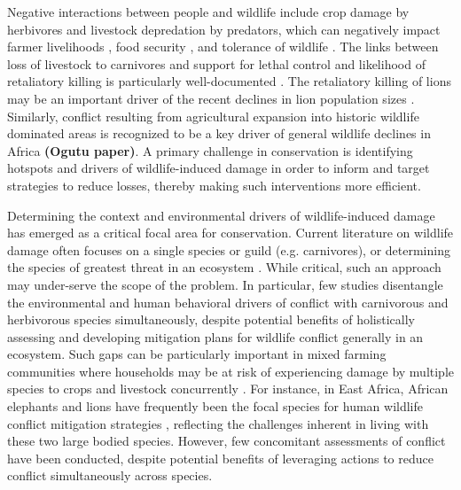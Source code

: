 \documentclass[12pt,]{article}
\begin{document}
Negative interactions between people and wildlife include crop damage by herbivores and livestock depredation by predators, which can negatively impact farmer livelihoods \citep{Hill2000, Kaswamila2007}, food security \citep{Hill2000, Kaswamila2007, Mackenzie2012}, and tolerance of wildlife \citep{Boer1998, Gadd2005ConservationKenya, Ogada2003, Bencin2016, Woodroffe2005, Kaltenborn2006, NaughtonTreves1997}. %
The links between loss of livestock to carnivores and support for lethal control and likelihood of retaliatory killing is particularly well-documented \citep{Ogada2003, Kissui2008}. The retaliatory killing of lions may be an important driver of the recent declines in lion population sizes \citep{Riggio2013, Ripple2014}. Similarly, conflict resulting from agricultural expansion into historic wildlife dominated areas is recognized to be a key driver of general wildlife declines in Africa \textbf{(Ogutu paper)}.  A primary challenge in conservation is identifying hotspots and drivers of wildlife-induced damage in order to inform and target strategies to reduce losses, thereby making such interventions more efficient. 

Determining the context and environmental drivers of wildlife-induced damage has emerged as a critical focal area for conservation. Current literature on wildlife damage often focuses on a single species or guild (e.g. carnivores), or determining the species of greatest threat in an ecosystem \citep{Dickman2013}. While critical, such an approach may under-serve the scope of the problem. In particular, few studies disentangle the environmental and human behavioral drivers of conflict with carnivorous and herbivorous species simultaneously, despite potential benefits of holistically assessing and developing mitigation plans for wildlife conflict generally in an ecosystem. Such gaps can be particularly important in mixed farming communities where households may be at risk of experiencing damage by multiple species to crops and livestock concurrently \citep{Karanth2012, Mwakatobe2014}. For instance, in East Africa, African elephants and lions have frequently been the focal species for human wildlife conflict mitigation strategies  \citep{NaughtonTreves1998,Naughton1999}, reflecting the challenges inherent in living with these two large bodied species.  However, few concomitant assessments of conflict have been conducted, despite potential benefits of leveraging actions to reduce conflict simultaneously across species. 
\end{document}

